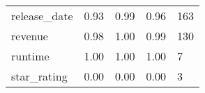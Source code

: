 \documentclass[11pt,a4paper]{article}
\begin{document}
\begin{table*}[ht]
\begin{tabular}{|l|llll|}
release\_date                                               & 0.93          & 0.99          & 0.96          & 163         \\
revenue                                                     & 0.98          & 1.00          & 0.99          & 130         \\
runtime                                                     & 1.00          & 1.00          & 1.00          & 7           \\
star\_rating                                                & 0.00          & 0.00          & 0.00          & 3                      \\ \hline
\end{tabular}
\end{table*}




%
%
%
%
\end{document}
